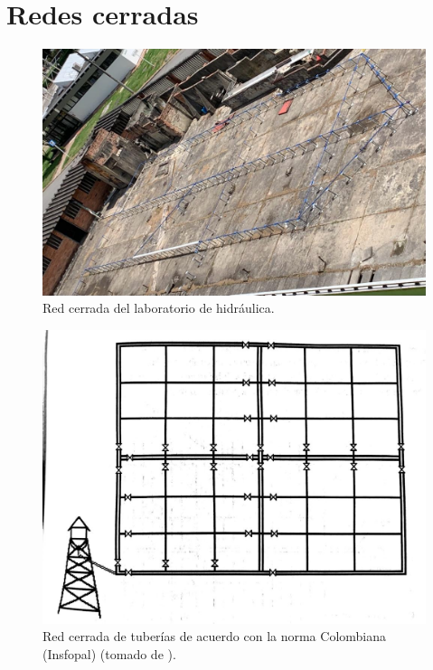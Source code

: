 \documentclass[11pt, oneside]{article}
\begin{document}
\section{Redes cerradas}
\begin{figure}[h]
\centering
\includegraphics[width=12cm]{./figs/cpn0.jpeg}
\caption{Red cerrada del laboratorio de hidr\'aulica.}
\label{cpn0}
\end{figure}

\begin{figure}[h]
\centering
\includegraphics[width=12cm]{./figs/cpn2.jpeg}
\caption{Red cerrada de tuber\'ias de acuerdo con la norma Colombiana (Insfopal) (tomado de \cite{saldarriaga}).} 
\label{cpn2}
\end{figure}
\end{document}
